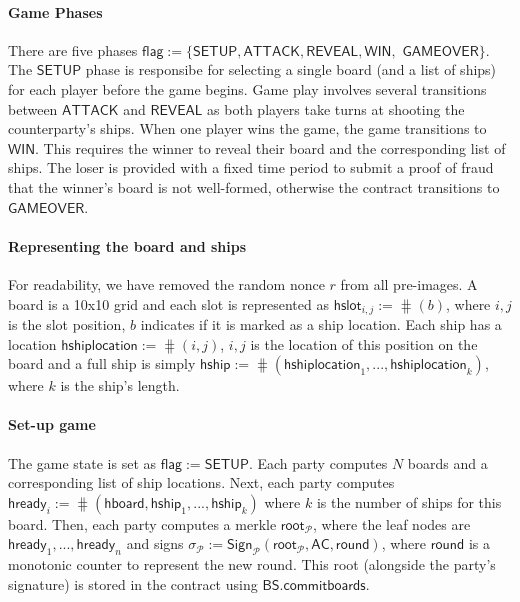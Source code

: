 \documentclass{llncs}
\newcommand{\gamestatus}{\mathsf{flag}}
\newcommand{\gamesetup}{\mathsf{SETUP}}
\newcommand{\gameattack}{\mathsf{ATTACK}}
\newcommand{\gamereveal}{\mathsf{REVEAL}}
\newcommand{\gamewinner}{\mathsf{WIN}}
\newcommand{\gamefinished}{\mathsf{GAMEOVER}}
\newcommand{\hready}{\mathsf{hready}}
\newcommand{\hboard}{\mathsf{hboard}}
\newcommand{\hslot}{\mathsf{hslot}}
\newcommand{\hship}{\mathsf{hship}}
\newcommand{\hshiplocation}{\mathsf{hshiplocation}}
\newcommand{\participant}{\mathcal{P}}
\newcommand{\sign}{\mathsf{Sign}}
\newcommand{\battleshipcommit}{\mathsf{BS.commitboards}}
\newcommand{\appcontract}{\mathsf{AC}}
\begin{document}
\paragraph{Game Phases} There are five phases $\gamestatus := \{\gamesetup, \gameattack, \gamereveal, \gamewinner,$ $ \gamefinished\}$. 
The $\gamesetup$ phase is responsibe for selecting a single board (and a list of ships) for each player before the game begins.
Game play involves several transitions between $\gameattack$ and $\gamereveal$ as both players take turns at shooting the counterparty's ships. 
When one player wins the game, the game transitions to $\gamewinner$.
This requires the winner to reveal their board and the corresponding list of ships. 
The loser is provided with a fixed time period to submit a proof of fraud that the winner's board is not well-formed, otherwise the contract transitions to $\gamefinished$. 

\paragraph{Representing the board and ships} 
For readability, we have removed the random nonce $r$ from all pre-images. 
A board is a 10x10 grid and each slot is represented as $\hslot_{i,j} := \hash(b)$, where $i,j$ is the slot position, $b$ indicates if it is marked as a ship location.
Each ship has a location $\hshiplocation := \hash(i,j)$, $i,j$ is the location of this position on the board and a full ship is simply $\hship := \hash(\hshiplocation_{1},...,\hshiplocation_{k})$, where $k$ is the ship's length.

\paragraph{Set-up game} The game state is set as $\gamestatus := \gamesetup$.
Each party computes $N$ boards and a corresponding list of ship locations. 
Next, each party computes $\hready_{i} := \hash(\hboard, \hship_{1},...,\hship_{k})$ where $k$ is the number of ships for this board. 
Then, each party computes a merkle $\mathsf{root}_{\participant}$, where the leaf nodes are $\hready_{1},...,\hready_{n}$ and signs $\sigma_{\participant} := \sign_{\participant}(\mathsf{root}_{\participant}, \appcontract, \mathsf{round})$, where $\mathsf{round}$ is a monotonic counter to represent the new round. 
This root (alongside the party's signature) is stored in the contract using $\battleshipcommit$. 
\end{document}
